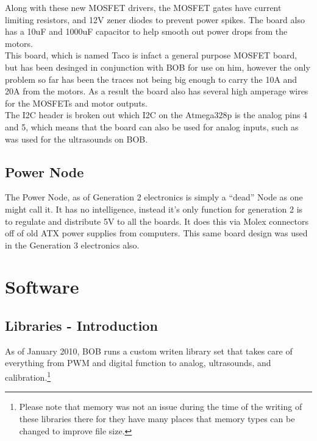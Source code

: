 \documentclass{article}
\begin{document}
Along with these new MOSFET drivers, the MOSFET gates have current limiting resistors, and 12V zener diodes to prevent power spikes. The board also has a 10uF and 1000uF capacitor to help smooth out power drops from the motors.\\
This board, which is named Taco is infact a general purpose MOSFET board, but has been desinged in conjunction with BOB for use on him, however the only problem so far has been the traces not being big enough to carry the 10A and 20A from the motors. As a result the board also has several high amperage wires for the MOSFETs and motor outputs.\\
The I2C header is broken out which I2C on the Atmega328p is the analog pins 4 and 5, which means that the board can also be used for analog inputs, such as was used for the ultrasounds on BOB.
\subsection{Power Node}
The Power Node, as of Generation 2 electronics is simply a “dead” Node as one might call it. It has no intelligence, instead it's only function for generation 2 is to regulate and distribute 5V to all the boards. It does this via Molex connectors off of old ATX power supplies from computers. This same board design was used in the Generation 3 electronics also.\\
\section{Software}
\subsection{Libraries - Introduction}
As of January 2010, BOB runs a custom writen library set that takes care of everything from PWM and digital function to analog, ultrasounds, and calibration.\footnote{Please note that memory was not an issue during the time of the writing of these libraries there for they have many places that memory types can be changed to improve file size.}\\
\end{document}
